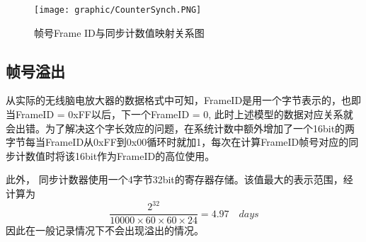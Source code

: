 \begin{figure}[!hbp]
\begin{center}
\texttt{[image: graphic/CounterSynch.PNG]}
\caption{ 帧号Frame ID与同步计数值映射关系图 \label{CorrespondingFIDCounter}}
\end{center}
\end{figure}

\subsection{帧号溢出}
	从实际的无线脑电放大器的数据格式中可知，FrameID是用一个字节表示的，也即当FrameID = 0xFF以后，下一个FrameID = 0, 此时上述模型的数据对应关系就会出错。为了解决这个字长效应的问题，在系统计数中额外增加了一个16bit的两字节每当FrameID从0xFF到0x00循环时就加1，每次在计算FrameID帧号对应的同步计数值时将该16bit作为FrameID的高位使用。

此外， 同步计数器使用一个4字节32bit的寄存器存储。该值最大的表示范围，经计算为
\begin{equation}
\frac{2^{32}}{10000 \times 60 \times 60 \times 24} = 4.97 \quad days
\end{equation}
因此在一般记录情况下不会出现溢出的情况。

